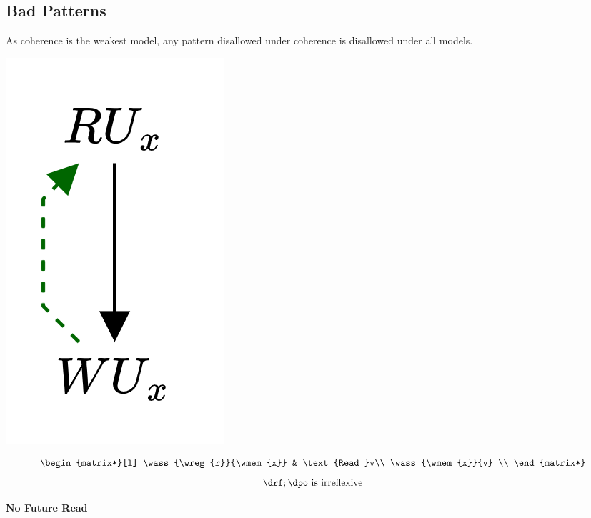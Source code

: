 \subsection{Bad Patterns}
As coherence is the weakest model, any pattern disallowed under coherence is disallowed under all models.
\\ \begin{minipage}[b]{.33\textwidth}
    \begin{center}
        \includegraphics[scale=.15]{declarative_semantics/images/bad_patterns_no_future_read.drawio.png}
    \end{center}
    \[
        \begin{matrix*}[l]
            \wass{\wreg{r}}{\wmem{x}} & \text{Read }v\\
            \wass{\wmem{x}}{v} \\
        \end{matrix*}    
    \]
    \[\drf ; \dpo \text{ is irreflexive}\]
    \centerline{\textbf{No Future Read}}
\end{minipage}
